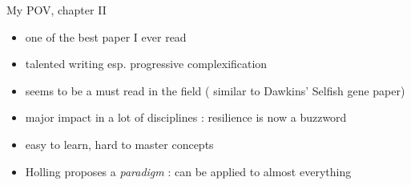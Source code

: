 \documentclass[11,aspectratio=1610]{beamer}
\begin{document}
\begin{frame}{My POV, chapter II}
\begin{itemize}
\item one of the best paper I ever read
\item talented writing  esp. progressive complexification 
\item seems to be a must read in the field ( similar to Dawkins' Selfish gene paper)
\vfill
\item major impact in a lot of disciplines : resilience is now a buzzword
\item easy to learn, hard to master  concepts
\item Holling proposes a \textit{paradigm} :  can be applied to almost everything
\end{itemize}

\end{frame}
\end{document}
